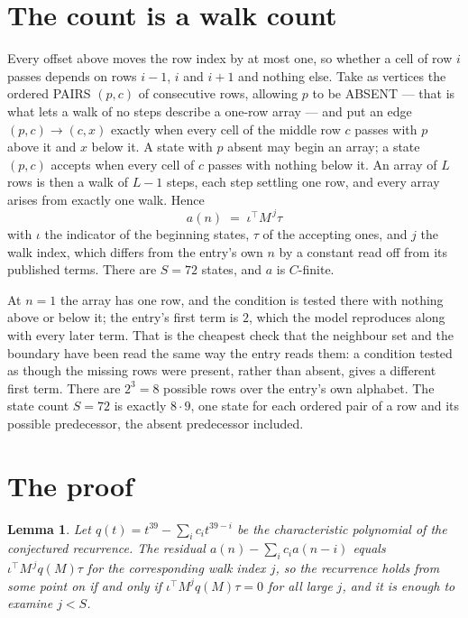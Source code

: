 \documentclass[11pt,a4paper]{article}
\theoremstyle{plain}
\newtheorem{lemma}[theorem]{Lemma}
\theoremstyle{definition}
\begin{document}
\section{The count is a walk count}

Every offset above moves the row index by at most one, so whether a cell of row $i$ passes
depends on rows $i-1$, $i$ and $i+1$ and nothing else. Take as vertices the ordered PAIRS
$(p,c)$ of consecutive rows, allowing $p$ to be ABSENT --- that is what lets a walk of no steps
describe a one-row array --- and put an edge $(p,c)\to(c,x)$ exactly when every cell of the
middle row $c$ passes with $p$ above it and $x$ below it. A state with $p$ absent may begin an
array; a state $(p,c)$ accepts when every cell of $c$ passes with nothing below it. An array of
$L$ rows is then a walk of $L-1$ steps, each step settling one row, and every array arises from
exactly one walk. Hence
\[
a(n)\;=\;\iota^{\!\top}M^{\,j}\tau
\]
with $\iota$ the indicator of the beginning states, $\tau$ of the accepting ones, and $j$ the
walk index, which differs from the entry's own $n$ by a constant read off from its published
terms. There are $S=72$ states, and $a$ is $C$-finite.

At $n=1$ the array has one row, and
the condition is tested there with nothing above or below it; the entry's first term is
$2$, which the model reproduces along with every later term. That is the cheapest check
that the neighbour set and the boundary have been read the same way the entry reads them: a
condition tested as though the missing rows were present, rather than absent, gives a different
first term. There are $2^{3}=8$ possible rows over the entry's own alphabet. The state count $S=72$ is exactly $8\cdot9$,
one state for each ordered pair of a row and its possible predecessor, the absent predecessor
included.

\section{The proof}

\begin{lemma}\label{lem:crit}
Let $q(t)=t^{39}-\sum_i c_it^{39-i}$ be the characteristic polynomial of the
conjectured recurrence. The residual $a(n)-\sum_ic_ia(n-i)$ equals
$\iota^{\!\top}M^{\,j}q(M)\tau$ for the corresponding walk index $j$, so the recurrence
holds from some point on if and only if $\iota^{\!\top}M^{j}q(M)\tau=0$ for all large $j$,
and it is enough to examine $j<S$.
\end{lemma}
\end{document}
